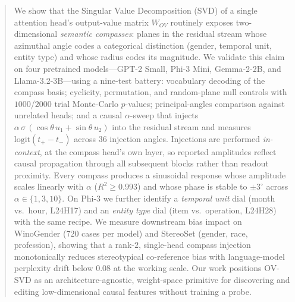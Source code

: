 \begin{abstract}
We show that the Singular Value Decomposition (SVD) of a single attention
head's output-value matrix $W_{OV}$ routinely exposes two-dimensional
\emph{semantic compasses}: planes in the residual stream whose azimuthal
angle codes a categorical distinction (gender, temporal unit, entity type)
and whose radius codes its magnitude. We validate this claim on four
pretrained models---GPT-2 Small, Phi-3 Mini, Gemma-2-2B, and
Llama-3.2-3B---using a nine-test battery: vocabulary decoding of the
compass basis; cyclicity, permutation, and random-plane null controls
with $1000$/$2000$ trial Monte-Carlo $p$-values; principal-angles
comparison against unrelated heads; and a causal $\alpha$-sweep that
injects $\alpha\,\sigma\,(\cos\theta\,u_1 + \sin\theta\,u_2)$ into the
residual stream and measures $\mathrm{logit}(t_{+} - t_{-})$ across
$36$ injection angles. Injections are performed \emph{in-context},
at the compass head's own layer, so reported amplitudes reflect causal
propagation through all subsequent blocks rather than readout proximity.
Every compass produces a sinusoidal response whose amplitude scales linearly
with $\alpha$ ($R^2 \ge 0.993$) and whose phase is stable to $\pm 3^\circ$
across $\alpha \in \{1, 3, 10\}$. On Phi-3 we further identify a
\emph{temporal unit} dial (month vs.\ hour, L24H17) and an \emph{entity
type} dial (item vs.\ operation, L24H28) with the same recipe. We
measure downstream bias impact on WinoGender ($720$ cases per model) and
StereoSet (gender, race, profession), showing that a rank-$2$, single-head
compass injection monotonically reduces stereotypical co-reference bias
with language-model perplexity drift below $0.08$ at the working scale.
Our work positions OV-SVD as an architecture-agnostic, weight-space
primitive for discovering and editing low-dimensional causal features
without training a probe.
\end{abstract}
